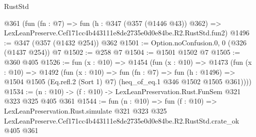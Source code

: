 \begin{lexlean}{RustStd}
\begin{coremodule}
    @361
    (fun (fn : @7) =>
    fun (h : @347 (@357 (@1446 @43)) @362) =>
    LexLeanPreserve.Cef171cc4b443111e8de2735e0d0e84be.R2.RustStd.fun2)
@1496 := @347 (@357 (@1432 @254)) @362
@1501 := Option.noConfusion.{0, 0} (@326 (@1437 @254)) @7
@1502 := @258 @7
@1504 := @1501 @1502 @7
@1505 := @360 @405
@1526 := fun (x : @10) =>
  @1454
    (fun (x : @10) =>
    @1473
      (fun (x : @10) =>
      @1492
        (fun (x : @10) =>
        fun (fn : @7) =>
        fun (h : @1496) =>
        @1504 @1505 (Eq.refl.{2} (Sort 1) @7) (heq_of_eq.{1} @346 @1502 @1505 @361))))
@1534 := (n : @10) -> (f : @10) -> LexLeanPreservation.Rust.FunSem @321 @323 @325 @405 @361
@1544 := fun (n : @10) =>
  fun (f : @10) =>
  LexLeanPreservation.Rust.simulate
    @321
    @323
    @325
    LexLeanPreserve.Cef171cc4b443111e8de2735e0d0e84be.R2.RustStd.crate_ok
    @405
    @361
\end{coremodule}
\end{lexlean}
